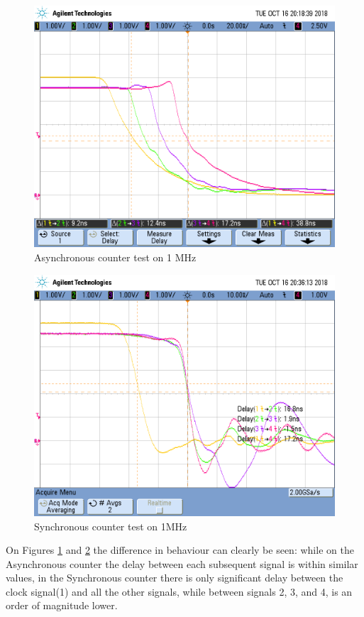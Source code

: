     \begin{figure}[h!]
        \begin{center}
            \includegraphics[width=0.6\linewidth]{../Exercise7/latex/images/e3_e7_async1mhz.png}
            \caption{\color{cyan}Asynchronous counter test on 1 MHz}
            \label{fig:e7asynctest2}
        \end{center}
    \end{figure}

    \begin{figure}[h!]
        \begin{center}
            \includegraphics[width=0.6\linewidth]{../Exercise7/latex/images/e3_e7_sync_1mhz.png}
            \caption{\color{cyan}Synchronous counter test on 1MHz}
            \label{fig:e7synctest2}
        \end{center}
    \end{figure}

    On Figures \ref{fig:e7asynctest2} and \ref{fig:e7synctest2} the difference in behaviour can clearly be seen:
    while on the Asynchronous counter the delay between each subsequent signal is within similar values, in the 
    Synchronous counter there is only significant delay between the clock signal(1) and all the other signals, while
    between signals 2, 3, and 4, is an order of magnitude lower.
    
